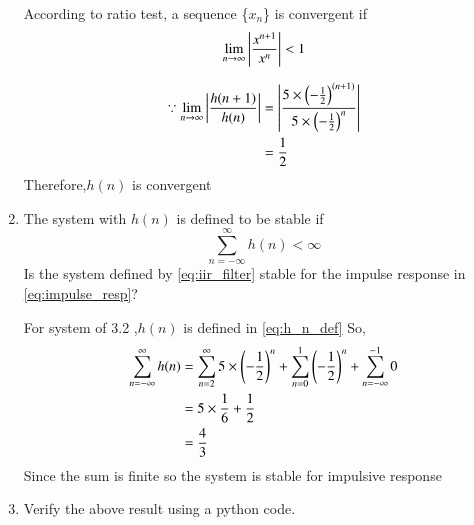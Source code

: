 \documentclass[journal,12pt,twocolumn]{IEEEtran}
\renewcommand\thesection{\arabic{section}}
\begin{document}
\begin{enumerate}[label=\thesection.\arabic*]
\solution According to ratio test, a sequence  \{$x_n$\} is convergent if 
\begin{align}
	\lim_{n \to \infty }\left\vert\frac{x^{n+1}}{x^n}\right\vert<1
\end{align}

\begin{align}
\because \lim_{n \to \infty} \left\vert\frac{h(n+1)}{h(n)}\right\vert&=\left\vert\frac{5\times \left(-\frac{1}{2}\right)^{(n+1)}}{5\times \left(-\frac{1}{2}\right)^n} \right\vert\\
&=\frac{1}{2}
\end{align}
Therefore,$h(n)$ is convergent
\item The system with $h(n)$ is defined to be stable if
\begin{equation}
\sum_{n=-\infty}^{\infty}h(n) < \infty
\end{equation}
Is the system defined by \eqref{eq:iir_filter} stable for the impulse response in \eqref{eq:impulse_resp}?

\solution For system of 3.2 ,$h(n)$ is defined in \eqref{eq:h_n_def} 
So,
\begin{align}
	\sum_{n=-\infty}^{\infty}h(n)&=\sum_{n=2}^{\infty}5\times \left(-\frac{1}{2}\right)^n+\sum_{n=0}^{1} \left(-\frac{1}{2}\right)^n+\sum_{n=-\infty}^{-1}0\\
	&=5\times \frac{1}{6}+\frac{1}{2}\\
	&=\frac{4}{3}
\end{align}
Since the sum is finite so the system is stable for impulsive response
\item Verify the above result using a python code.


\end{enumerate}
\end{document}
